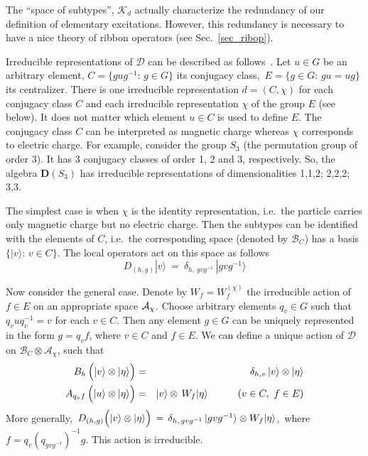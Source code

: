 \documentclass[12pt]{article}
\newcommand{\D}{\mathbf{D}}
\newcommand{\del}{\delta} %
\newcommand{\calA}{\mathcal{A}}
\newcommand{\calB}{\mathcal{B}}
\newcommand{\calD}{\mathcal{D}}
\newcommand{\calK}{\mathcal{K}}
\begin{document}
The ``space of subtypes'', $\calK_d$ actually characterize the redundancy of
our definition of elementary excitations. However, this redundancy is
necessary to have a nice theory of ribbon operators (see
Sec.~\ref{sec_ribop}).

Irreducible representations of $\calD$ can be described as follows~\cite{DPR}.
Let $u\in G$ be an arbitrary element, $C=\{gug^{-1}:\,g\in G\}$ its conjugacy
class,\, $E=\{g\in G:\,gu=ug\}$ its centralizer. There is one irreducible
representation $d=(C,\chi)$ for each conjugacy class $C$ and each irreducible
representation $\chi$ of the group $E$ (see below). It does not matter which
element $u\in C$ is used to define $E$. The conjugacy class $C$ can be
interpreted as magnetic charge whereas $\chi$ corresponds to electric
charge. For example, consider the group $S_3$ (the permutation group of order
3). It has 3 conjugacy classes of order 1, 2 and 3, respectively. So, the
algebra $\D(S_3)$ has irreducible representations of dimensionalities 1,1,2;
2,2,2; 3,3.

The simplest case is when $\chi$ is the identity representation, i.e.\ the
particle carries only magnetic charge but no electric charge. Then the
subtypes can be identified with the elements of $C$, i.e.\ the corresponding
space (denoted by $\calB_C$) has a basis $\{|v\rangle:\,v\in C\}$.  The local
operators act on this space as follows
\begin{equation} \label{vortrep}
  D_{(h,g)}|v\rangle\ =\ \del_{h,\,gvg^{-1}}\, |gvg^{-1}\rangle
\end{equation}

Now consider the general case. Denote by $W_f=W_f^{(\chi)}$ the irreducible
action of $f\in E$ on an appropriate space $\cal A_\chi$. Choose
arbitrary elements $q_v\in G$ such that $q_vuq_v^{-1}=v$ for each $v\in
C$. Then any element $g\in G$ can be uniquely represented in the form
$g=q_vf$, where $v\in C$ and $f\in E$. We can define a unique action of
$\calD$ on $\calB_C\otimes\calA_\chi$, such that
\begin{eqnarray}
  B_{h}\, \Bigl( |v\rangle\otimes|\eta\rangle \Bigr) &=& 
  \del_{h,v}\, |v\rangle\otimes|\eta\rangle        \\*
  A_{q_vf}\, \Bigl( |u\rangle\otimes|\eta\rangle \Bigr) &=& 
  |v\rangle\otimes\,W_f|\eta\rangle \qquad\quad (v\in C,\ f\in E) \nonumber
\end{eqnarray}
More generally,\, 
$D_{(h,g)}\Bigl(|v\rangle\otimes|\eta\rangle\Bigr)\,=\, 
 \del_{h,\,gvg^{-1}}\, |gvg^{-1}\rangle\otimes W_f|\eta\rangle$,\, 
where $f=q_v(q_{gvg^{-1}})^{-1}g$. This action is irreducible.
 
\end{document}
